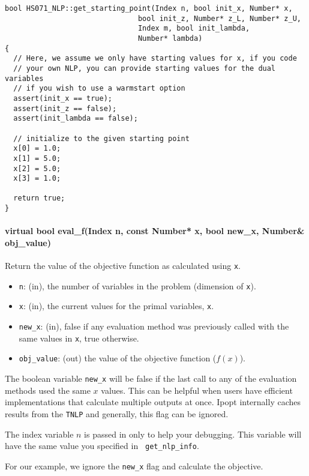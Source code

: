 \documentclass[letter,10pt]{article}
\begin{document}
{\begin{verbatim}
bool HS071_NLP::get_starting_point(Index n, bool init_x, Number* x,
                               bool init_z, Number* z_L, Number* z_U,
                               Index m, bool init_lambda,
                               Number* lambda)
{
  // Here, we assume we only have starting values for x, if you code
  // your own NLP, you can provide starting values for the dual variables
  // if you wish to use a warmstart option
  assert(init_x == true);
  assert(init_z == false);
  assert(init_lambda == false);

  // initialize to the given starting point
  x[0] = 1.0;
  x[1] = 5.0;
  x[2] = 5.0;
  x[3] = 1.0;

  return true;
}
\end{verbatim}

\paragraph{virtual bool eval\_f(Index n, const Number* x, 
                bool new\_x, Number\& obj\_value)} 
$\;$ \\
Return the value of the objective function as calculated using {\tt x}.
\begin{itemize}
\item {\tt n}: (in), the number of variables in the problem (dimension of {\tt x}). 
\item {\tt x}: (in), the current values for the primal variables, {\tt x}.
\item {\tt new\_x}: (in), false if any evaluation method was previously called 
        with the same values in {\tt x}, true otherwise.
\item {\tt obj\_value}: (out) the value of the objective function ($f(x)$).
\end{itemize}

The boolean variable {\tt new\_x} will be false if the last call to
any of the evaluation methods used the same $x$ values. This can be
helpful when users have efficient implementations that calculate
multiple outputs at once. Ipopt internally caches results from the
{\tt TNLP} and generally, this flag can be ignored.

The index variable $n$ is passed in only to help your debugging. This
variable will have the same value you specified in {\tt
get\_nlp\_info}.

For our example, we ignore the {\tt new\_x} flag and calculate the objective.

}
\end{document}
